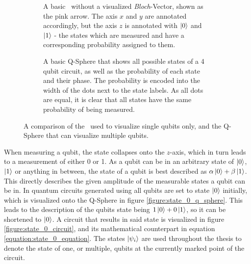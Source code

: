 \begin{figure}[!h]
    \centering
    \begin{subfigure}{.4\textwidth}
        \centering
        \scalebox{.6}{
            
        }
        \caption{A basic \bloch\ without a visualized \emph{Bloch}-Vector, shown as the pink arrow. The axis $x$ and $y$ are annotated accordingly, but the axis $z$ is annotated with $\ket{0}$ and $\ket{1}$ - the states which are measured and have a corresponding probability assigned to them.}
        \label{figure:basic_bloch_sphere}
    \end{subfigure}
    \begin{subfigure}{.4\textwidth}
        \centering
        \scalebox{\qspherewidth}{
            
        }
        \caption{A basic Q-Sphere that shows all possible states of a 4 qubit circuit, as well as the probability of each state and their phase. The probability is encoded into the width of the dots next to the state labels. As all dots are equal, it is clear that all states have the same probability of being measured.}
        \label{figure:q_sphere_4qubit_h}
    \end{subfigure}
    \caption{A comparison of the \bloch\ used to visualize single qubits only, and the Q-Sphere that can visualize multiple qubits.}
    \label{fig:comparison_bloch_sphere_q_sphere}
\end{figure}

\newpage

When measuring a qubit, the state collapses onto the $z$-axis\cite{feynman_feynman_1965}, which in turn leads to a measurement of either 0 or 1. As a qubit can be in an arbitrary state of $\ket{0}$, $\ket{1}$ or anything in between, the state of a qubit is best described as  $\alpha\ket{0}+\beta\ket{1}$. This directly describes the given amplitude of the measurable states a qubit can be in. In quantum circuits generated using  all qubits are set to state $\ket{0}$ initially, which is visualized onto the Q-Sphere in figure \ref{figure:state_0_q_sphere}. This leads to the description of the qubits state being $1\ket{0}+0\ket{1}$, so it can be shortened to $\ket{0}$. A circuit that results in said state is visualized in figure \ref{figure:state_0_circuit}, and its mathematical counterpart in equation \ref{equation:state_0_equation}. The states $\ket{\psi_i}$ are used throughout the thesis to denote the state of one, or multiple, qubits at the currently marked point of the circuit.

